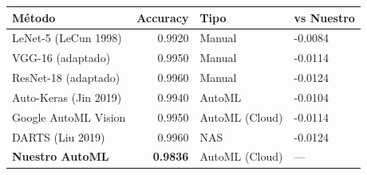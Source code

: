 \begin{tabular}{lrll}
\toprule
Método & Accuracy & Tipo & vs Nuestro \\
\midrule
LeNet-5 (LeCun 1998) & 0.9920 & Manual & -0.0084 \\
VGG-16 (adaptado) & 0.9950 & Manual & -0.0114 \\
ResNet-18 (adaptado) & 0.9960 & Manual & -0.0124 \\
Auto-Keras (Jin 2019) & 0.9940 & AutoML & -0.0104 \\
Google AutoML Vision & 0.9950 & AutoML (Cloud) & -0.0114 \\
DARTS (Liu 2019) & 0.9960 & NAS & -0.0124 \\
\midrule
\textbf{Nuestro AutoML} & \textbf{0.9836} & AutoML (Cloud) & --- \\
\bottomrule
\end{tabular}